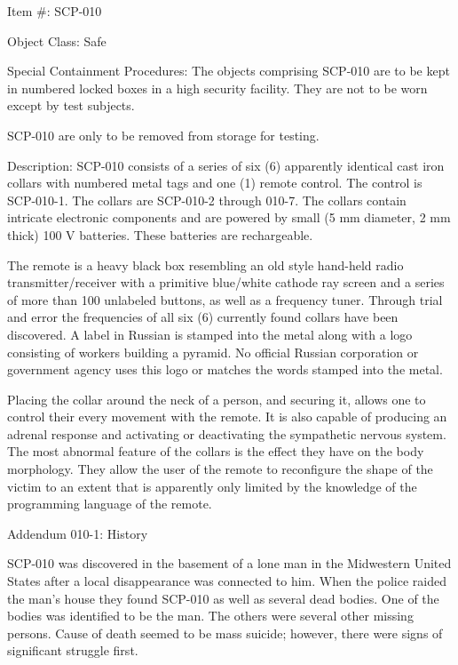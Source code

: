 Item \#: SCP-010

Object Class: Safe

Special Containment Procedures: The objects comprising SCP-010 are to be kept in numbered locked boxes in a high security facility. They are not to be worn except by test subjects.

SCP-010 are only to be removed from storage for testing.

Description: SCP-010 consists of a series of six (6) apparently identical cast iron collars with numbered metal tags and one (1) remote control. The control is SCP-010-1. The collars are SCP-010-2 through 010-7. The collars contain intricate electronic components and are powered by small (5 mm diameter, 2 mm thick) 100 V batteries. These batteries are rechargeable.

The remote is a heavy black box resembling an old style hand-held radio transmitter/receiver with a primitive blue/white cathode ray screen and a series of more than 100 unlabeled buttons, as well as a frequency tuner. Through trial and error the frequencies of all six (6) currently found collars have been discovered. A label in Russian is stamped into the metal along with a logo consisting of workers building a pyramid. No official Russian corporation or government agency uses this logo or matches the words stamped into the metal.

Placing the collar around the neck of a person, and securing it, allows one to control their every movement with the remote. It is also capable of producing an adrenal response and activating or deactivating the sympathetic nervous system. The most abnormal feature of the collars is the effect they have on the body morphology. They allow the user of the remote to reconfigure the shape of the victim to an extent that is apparently only limited by the knowledge of the programming language of the remote.

Addendum 010-1: History

SCP-010 was discovered in the basement of a lone man in the Midwestern United States after a local disappearance was connected to him. When the police raided the man's house they found SCP-010 as well as several dead bodies. One of the bodies was identified to be the man. The others were several other missing persons. Cause of death seemed to be mass suicide; however, there were signs of significant struggle first.

